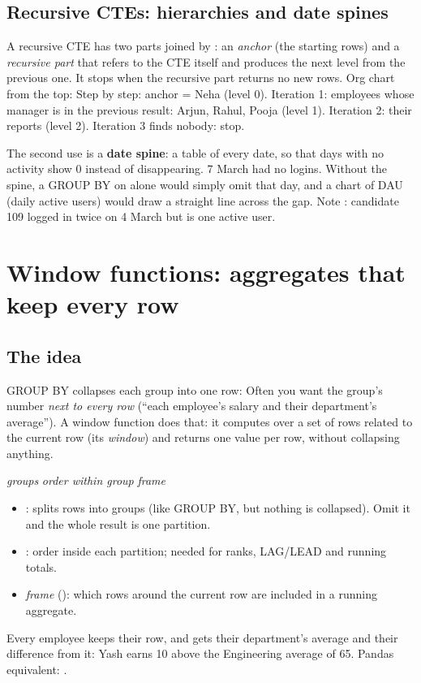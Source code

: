 \subsection{Recursive CTEs: hierarchies and date spines}
A recursive CTE has two parts joined by : an \emph{anchor} (the starting rows) and a \emph{recursive part} that refers to the CTE itself and
produces the next level from the previous one. It stops when the recursive part returns no new rows. Org chart from the top:
Step by step: anchor = Neha (level 0). Iteration 1: employees whose manager is in the previous result: Arjun, Rahul, Pooja (level 1). Iteration 2: their
reports (level 2). Iteration 3 finds nobody: stop.

The second use is a \textbf{date spine}: a table of every date, so that days with no activity show 0 instead of disappearing.
7 March had no logins. Without the spine, a GROUP BY on  alone would simply omit that day, and a chart of DAU (daily active users) would
draw a straight line across the gap. Note : candidate 109 logged in twice on 4 March but is one active user.

\section{Window functions: aggregates that keep every row}
\subsection{The idea}
GROUP BY collapses each group into one row:
Often you want the group's number \emph{next to every row} (``each employee's salary and their department's average''). A window function does that: it
computes over a set of rows related to the current row (its \emph{window}) and returns one value per row, without collapsing anything.
\begin{center}\small
{} \emph{groups}  \emph{order within group} \emph{frame}\code{)}
\end{center}
\begin{itemize}
\item {}: splits rows into groups (like GROUP BY, but nothing is collapsed). Omit it and the whole result is one partition.
\item {}: order inside each partition; needed for ranks, LAG/LEAD and running totals.
\item \emph{frame} (): which rows around the current row are included in a running aggregate.
\end{itemize}
Every employee keeps their row, and gets their department's average and their difference from it: Yash earns 10 above the Engineering average of 65.
Pandas equivalent: .

